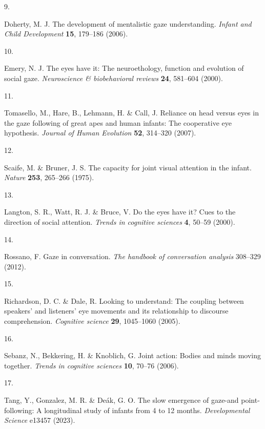 \documentclass[
  man,floatsintext]{apa6}
\newlength{\cslhangindent}
\newlength{\csllabelwidth}
\newlength{\cslentryspacingunit} %
\newenvironment{CSLReferences}[2] %
 {%
  \setlength{\parindent}{0pt}
  \ifodd #1
  \let\oldpar\par
  \def\par{\hangindent=\cslhangindent\oldpar}
  \fi
  \setlength{\parskip}{#2\cslentryspacingunit}
 }%
 {}
\newcommand{\CSLLeftMargin}[1]{\parbox[t]{\csllabelwidth}{#1}}
\newcommand{\CSLRightInline}[1]{\parbox[t]{\linewidth - \csllabelwidth}{#1}\break}
\begin{document}
\begin{CSLReferences}{0}{0}
\leavevmode{}%
\CSLLeftMargin{9. }%
\CSLRightInline{Doherty, M. J. The development of mentalistic gaze understanding. \emph{Infant and Child Development} \textbf{15}, 179--186 (2006).}

\leavevmode{}%
\CSLLeftMargin{10. }%
\CSLRightInline{Emery, N. J. The eyes have it: The neuroethology, function and evolution of social gaze. \emph{Neuroscience \& biobehavioral reviews} \textbf{24}, 581--604 (2000).}

\leavevmode{}%
\CSLLeftMargin{11. }%
\CSLRightInline{Tomasello, M., Hare, B., Lehmann, H. \& Call, J. Reliance on head versus eyes in the gaze following of great apes and human infants: The cooperative eye hypothesis. \emph{Journal of Human Evolution} \textbf{52}, 314--320 (2007).}

\leavevmode{}%
\CSLLeftMargin{12. }%
\CSLRightInline{Scaife, M. \& Bruner, J. S. The capacity for joint visual attention in the infant. \emph{Nature} \textbf{253}, 265--266 (1975).}

\leavevmode{}%
\CSLLeftMargin{13. }%
\CSLRightInline{Langton, S. R., Watt, R. J. \& Bruce, V. Do the eyes have it? Cues to the direction of social attention. \emph{Trends in cognitive sciences} \textbf{4}, 50--59 (2000).}

\leavevmode{}%
\CSLLeftMargin{14. }%
\CSLRightInline{Rossano, F. Gaze in conversation. \emph{The handbook of conversation analysis} 308--329 (2012).}

\leavevmode{}%
\CSLLeftMargin{15. }%
\CSLRightInline{Richardson, D. C. \& Dale, R. Looking to understand: The coupling between speakers' and listeners' eye movements and its relationship to discourse comprehension. \emph{Cognitive science} \textbf{29}, 1045--1060 (2005).}

\leavevmode{}%
\CSLLeftMargin{16. }%
\CSLRightInline{Sebanz, N., Bekkering, H. \& Knoblich, G. Joint action: Bodies and minds moving together. \emph{Trends in cognitive sciences} \textbf{10}, 70--76 (2006).}

\leavevmode{}%
\CSLLeftMargin{17. }%
\CSLRightInline{Tang, Y., Gonzalez, M. R. \& Deák, G. O. The slow emergence of gaze-and point-following: A longitudinal study of infants from 4 to 12 months. \emph{Developmental Science} e13457 (2023).}


\end{CSLReferences}
\end{document}
